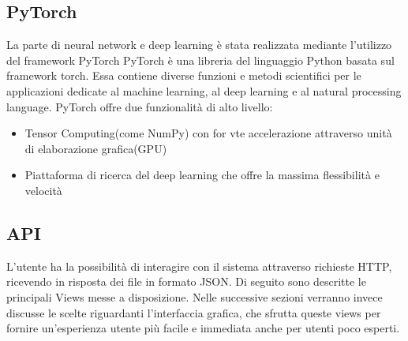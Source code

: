 \documentclass{article}
\begin{document}
\subsection{PyTorch}
La parte di neural network e deep learning è stata realizzata mediante l'utilizzo del framework PyTorch
PyTorch è una libreria del linguaggio Python basata sul framework torch.
Essa contiene diverse funzioni e metodi scientifici per le applicazioni dedicate al machine learning, al deep learning e al natural processing language.
PyTorch offre  due funzionalità di alto livello:
\begin{itemize}
\item Tensor Computing(come NumPy) con for vte accelerazione attraverso unità di elaborazione grafica(GPU)
\item Piattaforma di ricerca del deep learning che offre la massima flessibilità e  velocità 
\end{itemize}

\subsection{API}
L'utente ha la possibilità di interagire con il sistema attraverso richieste HTTP, ricevendo in risposta dei file in formato JSON. Di seguito sono descritte le principali Views messe a disposizione. Nelle successive sezioni verranno invece discusse le scelte riguardanti l'interfaccia grafica, che sfrutta queste views per fornire un'esperienza utente più facile e immediata anche per utenti poco esperti.
\end{document}
